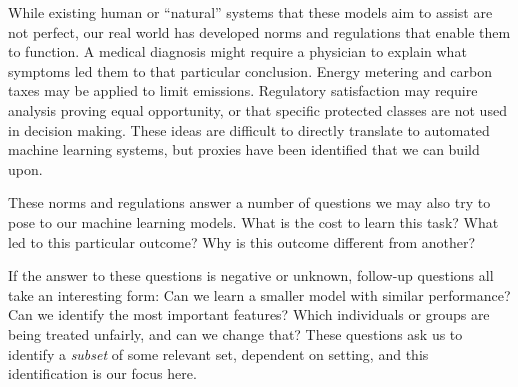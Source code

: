 While existing human or ``natural'' systems that these models aim to assist are not perfect, 
our real world has developed norms and regulations that 
enable them to function.
A medical diagnosis might require a physician to explain what symptoms led them to that particular conclusion.
Energy metering and carbon taxes may be applied to limit
emissions.
Regulatory satisfaction may require 
analysis proving equal opportunity,
or that specific protected classes
are not used in decision making.
These ideas are difficult to directly translate to automated machine learning systems,
but proxies have been identified that we can build upon.

These norms and regulations answer a number of questions we may also try to pose to our machine learning models.
What is the cost to learn this task?
What led to this particular outcome?
Why is this outcome different from another?

If the answer to these questions is negative or unknown,  follow-up questions all take an interesting form:
Can we learn a smaller model with similar performance? 
Can we identify the most important features? 
Which individuals or groups are being treated unfairly, and can we change that?
These questions ask us to identify a \textit{subset} of some relevant set, dependent on setting, and this identification is our focus here.

